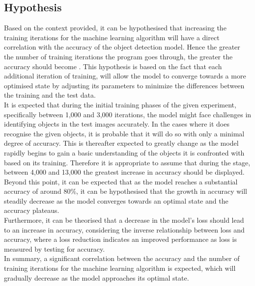 \subsection{Hypothesis}
Based on the context provided, it can be hypothesised that increasing the training iterations for the machine learning algorithm will have a direct correlation with the accuracy of the object detection model. Hence the greater the number of training iterations the program goes through, the greater the accuracy should become \parencite{Nagaki2021}. This hypothesis is based on the fact that each additional iteration of training, will allow the model to converge towards a more optimised state by adjusting its parameters to minimize the differences between the training and the test data.\\


It is expected that during the initial training phases of the given experiment, specifically between 1,000 and 3,000 iterations, the model might face challenges in identifying objects in the test images accurately. In the cases where it does recognise the given objects, it is probable that it will do so with only a minimal degree of accuracy. This is thereafter expected to greatly change as the model rapidly begins to gain a basic understanding of the objects it is confronted with based on its training. Therefore it is appropriate to assume that during the stage, between  4,000 and 13,000 the greatest increase in accuracy should be displayed.  Beyond this point, it can be expected that as the model reaches a substantial accuracy of around 80\%, it can be hypothesised that the growth in accuracy will steadily decrease as the model converges towards an optimal state and the accuracy plateaus.\\


Furthermore, it can be theorised that a decrease in the model's loss should lead to an increase in accuracy, considering the inverse relationship between loss and accuracy, where a loss reduction indicates an improved performance as loss is measured by testing for accuracy.\\


In summary, a significant correlation between the accuracy and the number of training iterations for the machine learning algorithm is expected, which will gradually decrease as the model approaches its optimal state.


